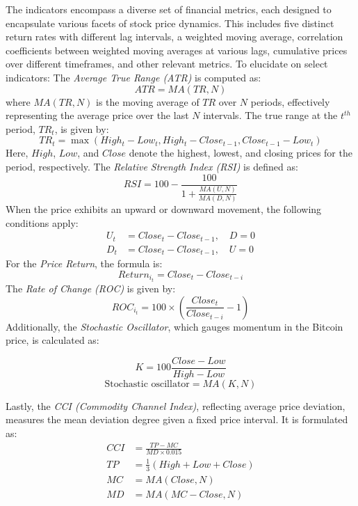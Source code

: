 \documentclass[sn-mathphys,Numbered]{sn-jnl}
\theoremstyle{thmstyleone}%
\theoremstyle{thmstyletwo}%
\theoremstyle{thmstylethree}%
\begin{document}
The indicators encompass a diverse set of financial metrics, each designed to encapsulate various facets of stock price dynamics. This includes five distinct return rates with different lag intervals, a weighted moving average, correlation coefficients between weighted moving averages at various lags, cumulative prices over different timeframes, and other relevant metrics. To elucidate on select indicators:
The \textit{Average True Range (ATR)} is computed as:
\begin{equation}
ATR = MA(TR,N)
\end{equation}
where \(MA(TR,N)\) is the moving average of \(TR\) over \(N\) periods, effectively representing the average price over the last \(N\) intervals. The true range at the \(t^{th}\) period, \(TR_t\), is given by:
\begin{equation}
TR_{t} = \max(High_t - Low_t, High_t - Close_{t-1}, Close_{t-1} - Low_{t})
\end{equation}
Here, \(High\), \(Low\), and \(Close\) denote the highest, lowest, and closing prices for the period, respectively.
The \textit{Relative Strength Index (RSI)} is defined as:
\begin{equation}
RSI = 100 - \frac{100}{1 + \frac{MA(U,N)}{MA(D,N)}}
\end{equation}
When the price exhibits an upward or downward movement, the following conditions apply:
\begin{align}
U_t &= Close_t - Close_{t-1}, \quad D = 0 \\
D_t &= Close_t - Close_{t-1}, \quad U = 0
\end{align}
For the \textit{Price Return}, the formula is:
\begin{equation}
Return_{i_{t}} = Close_t - Close_{t-i}
\end{equation}
The \textit{Rate of Change (ROC)} is given by:
\begin{equation}
ROC_{i_{t}} = 100 \times \left( \frac{Close_{t}}{Close_{t-i}} - 1 \right)
\end{equation}
Additionally, the \textit{Stochastic Oscillator}, which gauges momentum in the Bitcoin price, is calculated as:


\begin{equation}
K = 100\frac{Close-Low}{High-Low}
\end{equation}
\begin{equation}
\text{Stochastic oscillator} = MA(K,N)
\end{equation}

Lastly, the \textit{CCI (Commodity Channel Index)}, reflecting average price deviation, measures the mean deviation degree given a fixed price interval. It is formulated as:
\begin{align}
CCI &= \frac{TP - MC}{MD \times 0.015} \\
TP &= \frac{1}{3} (High + Low + Close) \\
MC &= MA(Close, N) \\
MD &= MA(MC - Close, N)
\end{align}
\end{document}
